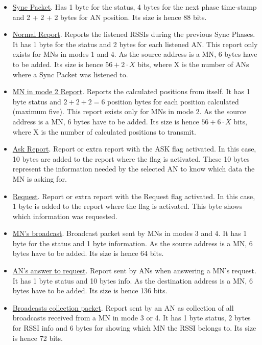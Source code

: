 \begin{itemize}
 \item \underline{Sync Packet}. Has 1 byte for the status, 4 bytes for the next phase time-stamp and 2 + 2 + 2 bytes for \ac{AN} position. 
Its size is hence 88 bits.
 \item \underline{Normal Report}. Reports the listened \acp{RSSI} during the previous Sync Phases. It has 1 byte for the status and 2 bytes 
for each listened \ac{AN}. This report only exists for \acp{MN} in modes 1 and 4. As the source address is a \ac{MN}, 6 bytes have to be added.
Its size is hence $56 + 2\cdot X$ bits, where X is the number of \acp{AN} where a Sync Packet was listened to.
 \item \underline{\ac{MN} in mode 2 Report}. Reports the calculated positions from itself. It has 1 byte status and $2 + 2 + 2 = 6$ position 
bytes for each position calculated (maximum five). This report exists only for \acp{MN} in mode 2. As the source address is a \ac{MN}, 6 bytes 
have to be added. Its size is hence $56 + 6\cdot X$ bits, where X is the number of calculated positions to transmit.
 \item \underline{Ask Report}. Report or extra report with the ASK flag activated. In this case, 10 bytes are added to the report where the
flag is activated. These 10 bytes represent the information needed by the selected \ac{AN} to know which data the \ac{MN} is asking for.
 \item \underline{Request}. Report or extra report with the Request flag activated. In this case, 1 byte is added to the report where the
flag is activated. This byte shows which information was requested.
 \item \underline{\ac{MN}'s broadcast}. Broadcast packet sent by \acp{MN} in modes 3 and 4. It has 1 byte for the status and 1 byte information.
As the source address is a \ac{MN}, 6 bytes have to be added. Its size is hence 64 bits.
 \item \underline{\ac{AN}'s answer to request}. Report sent by \acp{AN} when answering a \ac{MN}'s request. It has 1 byte status and 10 bytes info.
As the destination address is a \ac{MN}, 6 bytes have to be added. Its size is hence 136 bits.
 \item \underline{Broadcasts collection packet}. Report sent by an \ac{AN} as collection of all broadcasts received from a \ac{MN} in mode 3 
or 4. It has 1 byte status, 2 bytes for \ac{RSSI} info and 6 bytes for showing which \ac{MN} the \ac{RSSI} belongs to. Its size is hence 72 bits.
\end{itemize}

